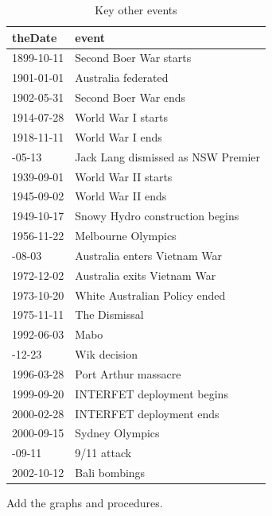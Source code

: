 \documentclass[12pt,]{article}
\theoremstyle{definition}
\theoremstyle{definition}
\theoremstyle{definition}
\theoremstyle{remark}
\begin{document}
\begin{table}

\caption{\label{tab:others}Key other events}
\centering
\fontsize{12}{14}\selectfont
\begin{tabular}[t]{ll}
\toprule
theDate & event\\
\midrule
1899-10-11 & Second Boer War starts\\
1901-01-01 & Australia federated\\
1902-05-31 & Second Boer War ends\\
1914-07-28 & World War I starts\\
1918-11-11 & World War I ends\\
\addlinespace
1932-05-13 & Jack Lang dismissed as NSW Premier\\
1939-09-01 & World War II starts\\
1945-09-02 & World War II ends\\
1949-10-17 & Snowy Hydro construction begins\\
1956-11-22 & Melbourne Olympics\\
\addlinespace
1962-08-03 & Australia enters Vietnam War\\
1972-12-02 & Australia exits Vietnam War\\
1973-10-20 & White Australian Policy ended\\
1975-11-11 & The Dismissal\\
1992-06-03 & Mabo\\
\addlinespace
1996-12-23 & Wik decision\\
1996-03-28 & Port Arthur massacre\\
1999-09-20 & INTERFET deployment begins\\
2000-02-28 & INTERFET deployment ends\\
2000-09-15 & Sydney Olympics\\
\addlinespace
2001-09-11 & 9/11 attack\\
2002-10-12 & Bali bombings\\
\bottomrule
\end{tabular}
\end{table}

Add the graphs and procedures.

\newpage




\newpage
\singlespacing 
\renewcommand\refname{References}

\end{document}
